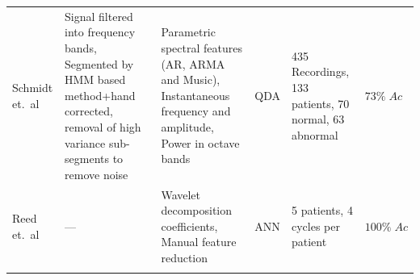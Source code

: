 \documentclass[titlepage, 12pt]{scrartcl} \usepackage{enumitem}
\newcommand{\dbottomrule}{\specialrule{1pt}{0pt}{1.4pt}%
            \specialrule{1pt}{0pt}{\belowrulesep}%
            }
\begin{document}
\begin{landscape}
\begin{table}[htbp]
\begin{tabulary}{\linewidth}{LLLLLL}
Schmidt et.~al \citeyearpar{Schmidt2015}          & Signal filtered into frequency bands, Segmented by HMM based method+hand corrected, removal of high variance sub-segments to remove noise & Parametric spectral features (AR, ARMA and Music), Instantaneous frequency and amplitude, Power in octave bands & QDA                   & 435 Recordings, 133 patients, 70 normal, 63 abnormal                                                                    & $73\%\;Ac$                                         \\
Reed et.~al \citeyearpar{Reed2004}             & ---                                                                                                                                       & Wavelet decomposition coefficients, Manual feature reduction                                                    & ANN                   & 5 patients, 4 cycles per patient                                                                                        & $100\%\;Ac$                                        \\
\dbottomrule\\
\end{tabulary}
\end{table}
\end{landscape}
\restoregeometry
\end{document}
